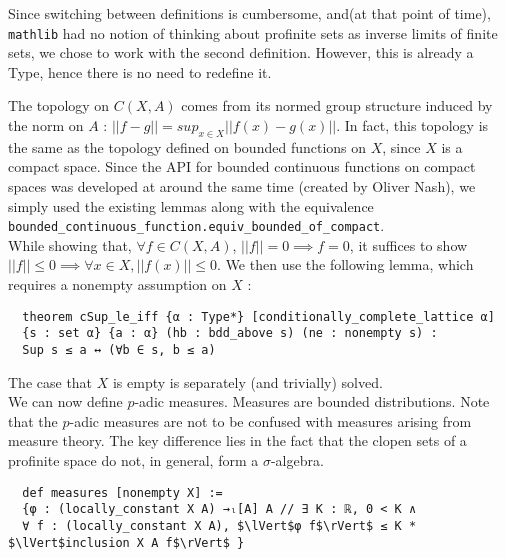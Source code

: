 \documentclass[a4paper,UKenglish,cleveref, autoref, thm-restate]{lipics-v2021}
\newcommand{\lean}[1]{\texttt{#1}\xspace} %
\begin{document}
Since switching between definitions is cumbersome, and(at that point of time), \lean{mathlib}
had no notion of thinking about profinite sets as inverse limits of finite sets, we chose to work
with the second definition. However, this is already a Type, hence there is no need to redefine it.

The topology on $C(X, A)$ comes from its normed group structure induced by the norm on $A$ :
$|| f - g || = sup_{x \in X} || f(x) - g(x) ||$. In fact, this topology is the same as the 
topology defined on bounded functions on $X$, since $X$ is a compact space. Since the API for bounded 
continuous functions on compact spaces was developed at around the same time (created by Oliver Nash), 
we simply used the existing lemmas along with the equivalence 
\lean{bounded\_continuous\_function.equiv\_bounded\_of\_compact}. \\

While showing that, $\forall f \in C(X, A)$, $||f|| = 0 \implies f = 0$, it suffices to show 
$||f|| \le 0 \implies \forall x \in X, ||f(x)|| \le 0$. We then use the following lemma, which 
requires a nonempty assumption on $X$ :
\begin{lstlisting}
  theorem cSup_le_iff {α : Type*} [conditionally_complete_lattice α] 
  {s : set α} {a : α} (hb : bdd_above s) (ne : nonempty s) : 
  Sup s ≤ a ↔ (∀b ∈ s, b ≤ a)
\end{lstlisting}

The case that $X$ is empty is separately (and trivially) solved. \\

We can now define $p$-adic measures. Measures are bounded distributions. Note that the $p$-adic measures
are not to be confused with measures arising from measure theory. The key difference lies in the
fact that the clopen sets of a profinite space do not, in general, form a $\sigma$-algebra. \\

\begin{lstlisting}
  def measures [nonempty X] :=
  {φ : (locally_constant X A) →ₗ[A] A // ∃ K : ℝ, 0 < K ∧ 
  ∀ f : (locally_constant X A), $\lVert$φ f$\rVert$ ≤ K * $\lVert$inclusion X A f$\rVert$ }
\end{lstlisting}
\end{document}
